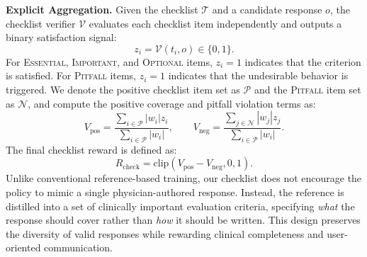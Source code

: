 \documentclass[letterpaper]{article} %
\begin{document}
\vspace{2pt}
\noindent \textbf{Explicit Aggregation.}
Given the checklist $\mathcal{T}$ and a candidate response $o$, the checklist verifier $\mathcal{V}$ evaluates each checklist item independently and outputs a binary satisfaction signal:
\begin{equation}
z_i = \mathcal{V}(t_i, o) \in \{0,1\}.
\end{equation}
For \textsc{Essential}, \textsc{Important}, and \textsc{Optional} items, $z_i=1$ indicates that the criterion is satisfied. For \textsc{Pitfall} items, $z_i=1$ indicates that the undesirable behavior is triggered. 
We denote the positive checklist item set as $\mathcal{P}$ and the \textsc{Pitfall} item set as $\mathcal{N}$, and compute the positive coverage and pitfall violation terms as: 
\begin{equation}
V_{\mathrm{pos}}
=
\frac{
\sum_{i\in\mathcal{P}} |w_i| z_i
}{
\sum_{i\in\mathcal{P}} |w_i|
},
\qquad
V_{\mathrm{neg}}
=
\frac{
\sum_{j\in\mathcal{N}} |w_j| z_j
}{
\sum_{i\in\mathcal{P}} |w_i|
}.
\end{equation}
The final checklist reward is defined as:
\begin{equation}
R_{\mathrm{check}}
=
\mathrm{clip}\!\left(
V_{\mathrm{pos}} - V_{\mathrm{neg}},
0,
1
\right).
\end{equation}
Unlike conventional reference-based training, our checklist does not encourage the policy to mimic a single physician-authored response. Instead, the reference is distilled into a set of clinically important evaluation criteria, specifying \emph{what} the response should cover rather than \emph{how} it should be written. This design preserves the diversity of valid responses while rewarding clinical completeness and user-oriented communication.
\end{document}
